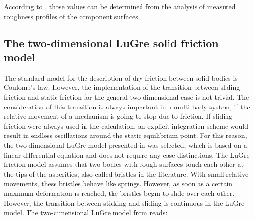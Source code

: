 According to \cite{Tomanik-2003}, those values can be determined from the analysis of measured roughness profiles of the component surfaces.

\subsection{The two-dimensional LuGre solid friction model} \label{sec:h500}
The standard model for the description of dry friction between solid bodies is Coulomb's law. However, the implementation of the transition between sliding friction and static friction for the general two-dimensional case is not trivial. The consideration of this transition is always important in a multi-body system, if the relative movement of a mechanism is going to stop due to friction. If sliding friction were always used in the calculation, an explicit integration scheme would result in endless oscillations around the static equilibrium point. For this reason, the two-dimensional LuGre model presented in \cite{LuGre2D} was selected, which is based on a linear differential equation and does not require any case distinctions. The LuGre friction model assumes that two bodies with rough surfaces touch each other at the tips of the asperities, also called bristles in the literature. With small relative movements, these bristles behave like springs. However, as soon as a certain maximum deformation is reached, the bristles begin to slide over each other. However, the transition between sticking and sliding is continuous in the LuGre model. The two-dimensional LuGre model from \cite{LuGre2D} reads:
